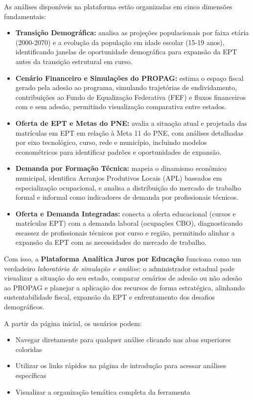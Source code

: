 As análises disponíveis na plataforma estão organizadas em cinco dimensões fundamentais:
\begin{itemize}
	\item \textbf{Transição Demográfica:} analisa as projeções populacionais por faixa etária (2000-2070) e a evolução da população em idade escolar (15-19 anos), identificando janelas de oportunidade demográfica para expansão da EPT antes da transição estrutural em curso.
	
	\item \textbf{Cenário Financeiro e Simulações do PROPAG:} estima o espaço fiscal gerado pela adesão ao programa, simulando trajetórias de endividamento, contribuições ao Fundo de Equalização Federativa (FEF) e fluxos financeiros com e sem adesão, permitindo visualização comparativa entre estados.
	
	\item \textbf{Oferta de EPT e Metas do PNE:} avalia a situação atual e projetada das matrículas em EPT em relação à Meta 11 do PNE, com análises detalhadas por eixo tecnológico, curso, rede e município, incluindo modelos econométricos para identificar padrões e oportunidades de expansão.
	
	\item \textbf{Demanda por Formação Técnica:} mapeia o dinamismo econômico municipal, identifica Arranjos Produtivos Locais (APL) baseados em especialização ocupacional, e analisa a distribuição do mercado de trabalho formal e informal como indicadores de demanda por profissionais técnicos.
	
	\item \textbf{Oferta e Demanda Integradas:} conecta a oferta educacional (cursos e matrículas EPT) com a demanda laboral (ocupações CBO), diagnosticando escassez de profissionais técnicos por curso e região, permitindo alinhar a expansão da EPT com as necessidades do mercado de trabalho.
\end{itemize}


Com isso, a \textbf{Plataforma Analítica Juros por Educação} funciona como um verdadeiro \textit{laboratório de simulação e análise}: o administrador estadual pode visualizar a situação do seu estado, comparar cenários de adesão ou não adesão ao PROPAG e planejar a aplicação dos recursos de forma estratégica, alinhando sustentabilidade fiscal, expansão da EPT e enfrentamento dos desafios demográficos.

A partir da página inicial, os usuários podem:
\begin{itemize}
	\item Navegar diretamente para qualquer análise clicando nas abas superiores coloridas
	\item Utilizar os links rápidos na página de introdução para acessar análises específicas
	\item Visualizar a organização temática completa da ferramenta
\end{itemize}

